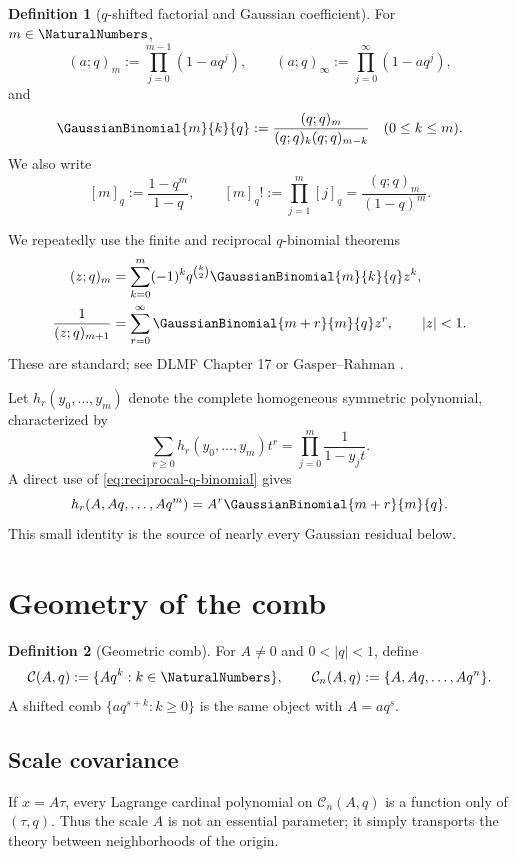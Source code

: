 \documentclass[11pt,oneside]{article}
\numberwithin{equation}{section}
\theoremstyle{definition}
\newtheorem{definition}[definition]{Definition}
\theoremstyle{remark}
\newcommand{\Cc}{\mathcal C}
\begin{document}
\begin{definition}[$q$-shifted factorial and Gaussian coefficient]
For $m\in\NaturalNumbers$,
\[
 (a;q)_m:=\prod_{j=0}^{m-1}(1-aq^j),\qquad
 (a;q)_\infty:=\prod_{j=0}^{\infty}(1-aq^j),
\]
and
\[
 \GaussianBinomial{m}{k}{q}:=\frac{(q;q)_m}{(q;q)_k(q;q)_{m-k}}
 \quad(0\le k\le m).
\]
We also write
\[
 [m]_q:=\frac{1-q^m}{1-q},\qquad
 [m]_q!:=\prod_{j=1}^m[j]_q=\frac{(q;q)_m}{(1-q)^m}.
\]
\end{definition}

We repeatedly use the finite and reciprocal $q$-binomial theorems
\begin{align}
 (z;q)_m
 &=\sum_{k=0}^m(-1)^kq^{\binom{k}{2}}\GaussianBinomial{m}{k}{q} z^k,
 \label{eq:finite-q-binomial}\\
 \frac1{(z;q)_{m+1}}
 &=\sum_{r=0}^{\infty}\GaussianBinomial{m+r}{m}{q}z^r,
 \qquad |z|<1.
 \label{eq:reciprocal-q-binomial}
\end{align}
These are standard; see DLMF Chapter 17 \cite{DLMF17} or
Gasper--Rahman \cite{GasperRahman}.

Let $h_r(y_0,\ldots,y_m)$ denote the complete homogeneous symmetric
polynomial, characterized by
\[
 \sum_{r\ge0}h_r(y_0,\ldots,y_m)t^r
 =\prod_{j=0}^m\frac1{1-y_jt}.
\]
A direct use of \eqref{eq:reciprocal-q-binomial} gives
\begin{equation}
 h_r(A,Aq,\ldots,Aq^m)=A^r\GaussianBinomial{m+r}{m}{q}.
 \label{eq:h-geometric}
\end{equation}
This small identity is the source of nearly every Gaussian residual below.

\section{Geometry of the comb}

\begin{definition}[Geometric comb]
For $A\ne0$ and $0<|q|<1$, define
\[
 \Cc(A,q):=\{Aq^k:k\in\NaturalNumbers\},\qquad
 \Cc_n(A,q):=\{A,Aq,\ldots,Aq^n\}.
\]
A shifted comb $\{aq^{s+k}:k\ge0\}$ is the same object with $A=aq^s$.
\end{definition}

\subsection{Scale covariance}

If $x=A\tau$, every Lagrange cardinal polynomial on $\Cc_n(A,q)$ is a
function only of $(\tau,q)$.  Thus the scale $A$ is not an essential parameter;
it simply transports the theory between neighborhoods of the origin.
\end{document}
